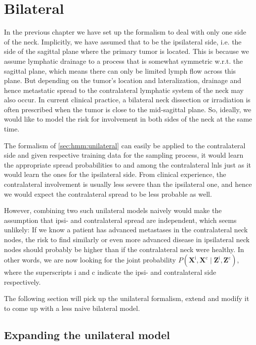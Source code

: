 \documentclass[\relativeRoot/main.tex]{subfiles}
\begin{document}
\section{Bilateral}
\label{sec:hmm:bilateral}

In the previous chapter we have set up the formalism to deal with only one side of the neck. Implicitly, we have assumed that to be the ipsilateral side, i.e. the side of the sagittal plane where the primary tumor is located. This is because we assume lymphatic drainage to a process that is somewhat symmetric w.r.t. the sagittal plane, which means there can only be limited lymph flow across this plane. But depending on the tumor's location and lateralization, drainage and hence metastatic spread to the contralateral lymphatic system of the neck may also occur. In current clinical practice, a bilateral neck dissection or irradiation is often prescribed when the tumor is close to the mid-sagittal plane. So, ideally, we would like to model the risk for involvement in both sides of the neck at the same time.

The formalism of \cref{sec:hmm:unilateral} can easily be applied to the contralateral side and given respective training data for the sampling process, it would learn the appropriate spread probabilities to and among the contralateral \glspl{lnl} just as it would learn the ones for the ipsilateral side. From clinical experience, the contralateral involvement is usually less severe than the ipsilateral one, and hence we would expect the contralateral spread to be less probable as well. 

However, combining two such unilateral models naively would make the assumption that ipsi- and contralateral spread are independent, which seems unlikely: If we know a patient has advanced metastases in the contralateral neck nodes, the risk to find similarly or even more advanced disease in ipsilateral neck nodes should probably be higher than if the contralateral neck were healthy. In other words, we are now looking for the joint probability $P \left( \mathbf{X}^\text{i}, \mathbf{X}^\text{c} \mid \mathbf{Z}^\text{i}, \mathbf{Z}^\text{c} \right)$, where the superscripts $\text{i}$ and $\text{c}$ indicate the ipsi- and contralateral side respectively.

The following section will pick up the unilateral formalism, extend and modify it to come up with a less naive bilateral model.

\subsection{Expanding the unilateral model}
\label{subsec:hmm:bilateral:expand}
\end{document}
